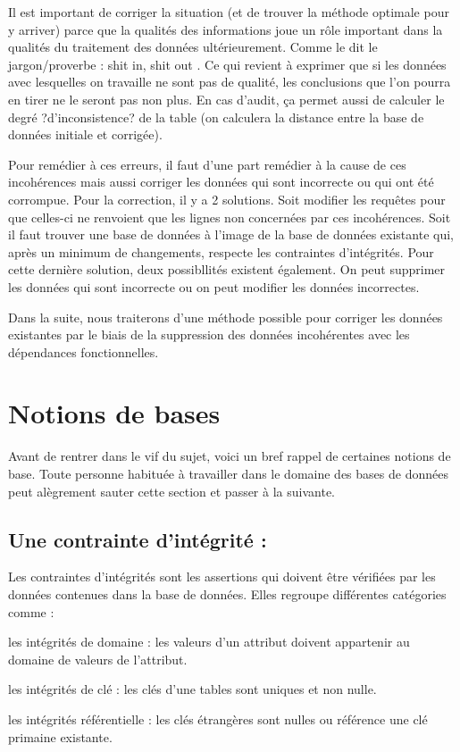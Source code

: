 \documentclass[12pt, a4paper, oneside, titlepage]{book}%
\begin{document}
Il est important de corriger la situation (et de trouver la méthode optimale pour y arriver) parce que la qualités des informations joue un rôle important dans la qualités du traitement des données ultérieurement. Comme le dit le jargon/proverbe : \og shit in, shit out \fg. Ce qui revient à exprimer que si les données avec lesquelles on travaille ne sont pas de qualité, les conclusions que l'on pourra en tirer ne le seront pas non plus. En cas d'audit, ça permet aussi de calculer le degré ?d'inconsistence? de la table (on calculera la distance entre la base de données initiale et corrigée). 

Pour remédier à ces erreurs, il faut d'une part remédier à la cause de ces incohérences mais aussi corriger les données qui sont incorrecte ou qui ont été corrompue. Pour la correction, il y a 2 solutions. Soit modifier les requêtes pour que celles-ci ne renvoient que les lignes non concernées par ces incohérences. Soit il faut trouver une base de données à l’image de la base de données existante qui, après un minimum de changements, respecte les contraintes d’intégrités. Pour cette dernière solution, deux possibllités existent également. On peut supprimer les données qui sont incorrecte ou on peut modifier les données incorrectes.

Dans la suite, nous traiterons d'une méthode possible pour corriger les données existantes par le biais de la suppression des données incohérentes avec les dépendances fonctionnelles.



\clearpage

\section{Notions de bases}\label{SECbase}
Avant de rentrer dans le vif du sujet, voici un bref rappel de certaines notions de base. Toute personne habituée à travailler dans le domaine des bases de données peut alègrement sauter cette section et passer à la suivante.


\subsection{Une contrainte d'intégrité : } 
Les contraintes d'intégrités sont les assertions qui doivent être vérifiées par les données contenues dans la base de données. Elles regroupe différentes catégories comme : 
\begin{description}
\item {les intégrités de domaine :} les valeurs d'un attribut doivent appartenir au domaine de valeurs de l'attribut.
\item {les intégrités de clé :} les clés d'une tables sont uniques et non nulle.
\item {les intégrités référentielle :} les clés étrangères sont nulles ou référence une clé primaine existante.
\end{description}
\end{document}
